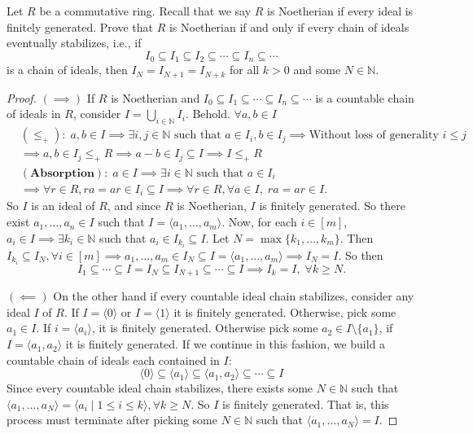 \documentclass[addpoints,10pt]{exam}
\theoremstyle{plain}
\theoremstyle{definition}
\newtheorem{prob}[thm]{Problem}
\theoremstyle{plain}
\theoremstyle{plain}
\theoremstyle{definition}
\let\oldprob\prob
\let\endoldprob\endprob
\renewenvironment{prob}
  {\begin{singlespace}\oldprob}
  {\endoldprob\end{singlespace}}
\newcommand{\NN}{\ensuremath{\mathbb{N}}}
\begin{document}
\newpage
\setcounter{thm}{2} %
\begin{prob}
Let $R$ be a commutative ring. Recall that we say $R$ is Noetherian if every ideal is finitely generated. Prove that $R$ is Noetherian if and only if every chain of ideals eventually stabilizes, i.e., if
\[
I_0 \subseteq I_1 \subseteq I_2 \subseteq \cdots \subseteq I_n \subseteq \cdots
\]
is a chain of ideals, then $I_N = I_{N+1} = I_{N+k}$ for all $k>0$ and some $N \in \NN$.
\end{prob}
\begin{proof}
    $(\implies)$ If $R$ is Noetherian and $I_{0}\subseteq I_{1}\subseteq \cdots \subseteq I_{n}\subseteq \cdots $ is a countable chain of ideals in $R$, consider $I=\bigcup_{i\in \NN}I_{i}.$ Behold. $\forall a,b\in I$
    \begin{align*}
        &\mathbf{(\leq_{+}):}\;a,b\in I\implies \exists i,j\in \NN \text{ such that }a\in I_{i},b\in I_{j}\implies \text{Without loss of generality }i\leq j\\
        &\implies a,b\in I_{j}\leq_{+} R\implies a-b\in I_{j}\subseteq I\implies I\leq_{+}R\\
        &\mathbf{(Absorption):}\; a\in I\implies \exists i\in \NN \text{ such that }a\in I_{i}\\
        &\implies \forall r\in R, ra=ar\in I_{i}\subseteq I\implies \forall r\in R,\forall a\in I,\; ra=ar\in I.
    \end{align*}
    So $I$ is an ideal of $R$, and since $R$ is Noetherian, $I$ is finitely generated. So there exist $a_{1},\ldots,a_{n}\in I$ such that $I=\langle a_{1},\hdots,a_{m}\rangle$. Now, for each $i\in [m]$, $a_{i}\in I\implies \exists k_{i}\in \NN$ such that $a_{i}\in I_{k_{i}}\subseteq I$. Let $N=\max\{k_{1},\ldots,k_{m}\}$. Then $I_{k_{i}}\subseteq I_{N},\forall i\in [m]\implies a_{1},\hdots, a_{m}\in I_{N}\subseteq I=\langle a_{1},\hdots, a_{m}\rangle\implies I_{N}=I.$ So then 
        $$I_{1}\subseteq \cdots \subseteq I=I_{N}\subseteq I_{N+1}\subseteq \cdots \subseteq I\implies I_{k}=I,\;\forall k\geq N.$$

    $(\impliedby)$ On the other hand if every countable ideal chain stabilizes, consider any ideal $I$ of $R$. If $I=\langle 0\rangle$ or $I=\langle 1\rangle$ it is finitely generated. Otherwise, pick some $a_{1}\in I$. If $i=\langle a_{i}\rangle$, it is finitely generated. Otherwise pick some $a_{2}\in I\setminus \{a_{1}\}$, if $I=\langle a_{1},a_{2}\rangle$ it is finitely generated. If we continue in this fashion, we build a countable chain of ideals each contained in $I$:
        $$\langle 0\rangle \subseteq \langle a_{1}\rangle \subseteq \langle a_{1},a_{2}\rangle \subseteq \cdots \subseteq I$$
    Since every countable ideal chain stabilizes, there exists some $N\in \NN$ such that $\langle a_{1},\hdots,a_{N}\rangle = \langle a_{i}\mid 1\leq i\leq k\rangle,\forall k\geq N$. So $I$ is finitely generated. That is, this process must terminate after picking some $N\in \NN$ such that $\langle a_{1},\hdots, a_{N}\rangle = I$.

\end{proof}
\end{document}
